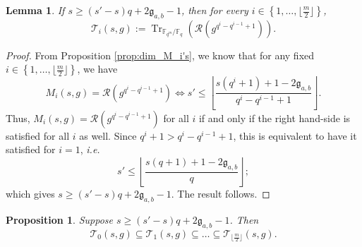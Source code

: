 \documentclass[a4paper]{article}
\newtheorem{proposition}[thm]{Proposition}
\newtheorem{lemma}[thm]{Lemma}
\theoremstyle{definition}
\theoremstyle{remark}
\newcommand{\calR}{\mathcal{R}}
\newcommand{\calT}{\mathcal{T}}
\newcommand{\fq}{\mathbb{F}_{q}}
\newcommand{\Tr}[1]{\operatorname{Tr}_{\mathbb{F}_{q^m}/\fq}\left(#1\right)}
\newcommand{\set}[1]{\left\{#1\right\}}
\begin{document}
\begin{lemma} \label{lem:cond_inclusion_T_i's}
    If $s \geq (s'-s)q+2\mathfrak{g}_{a,b}-1$, then for every $i \in \set{1,\dots,\lfloor \frac{m}{2} \rfloor}$,
    $$\calT_i(s,g) := \Tr{\calR(g^{q^i-q^{i-1}+1})}.$$
\end{lemma}

\begin{proof}
    From Proposition \ref{prop:dim_M_i's}, we know that for any fixed $i \in \set{1,\dots,\lfloor \frac{m}{2} \rfloor}$, we have 
    $$M_i(s,g) = \calR(g^{q^i-q^{i-1}+1}) \iff  s' \leq \left\lfloor \dfrac{s(q^i+1)+1-2\mathfrak{g}_{a,b}}{q^i-q^{i-1}+1}\right\rfloor.$$
    Thus, $M_i(s,g) = \calR(g^{q^i-q^{i-1}+1})$ for all $i$ if and only if the right hand-side is satisfied for all $i$ as well. Since $q^i+1 > q^i-q^{i-1}+1$, this is equivalent to have it satisfied for $i=1$, \emph{i.e.}
    $$s' \leq \left\lfloor \dfrac{s(q+1)+1-2\mathfrak{g}_{a,b}}{q}\right\rfloor;$$
    which gives $s \geq (s'-s)q+2\mathfrak{g}_{a,b}-1$. The result follows.
\end{proof}

\begin{proposition} \label{prop:inclusion_T_i's} Suppose $s \geq (s'-s)q+2\mathfrak{g}_{a,b}-1$. Then
    $$\calT_0(s,g) \subseteq \calT_1(s,g) \subseteq \dots \subseteq \calT_{\lfloor \frac{m}{2}\rfloor}(s,g).$$
\end{proposition}
\end{document}
